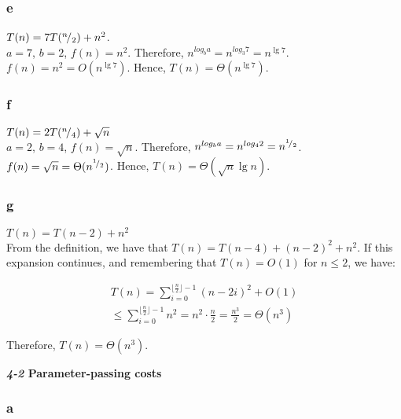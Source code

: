 \documentclass[8pt,a4paper]{article}
\begin{document}
\subsubsection*{e}

$T(n) = 7T({}^{n}\!/_{2}) + n^{2}$. \\
$a = 7$, $b = 2$, $f(n) = n^{2}$. Therefore, $n^{log_{b} a} = n^{log_{3} 7} = n^{\lg 7}$.
$f(n) = n^{2} = O(n^{\lg 7})$. Hence, $T(n) = \Theta(n^{\lg 7})$.

\subsubsection*{f}

$T(n) = 2T({}^{n}\!/_{4}) + \sqrt{n}$ \\
$a = 2$, $b = 4$, $f(n) = \sqrt{n}$. Therefore, $n^{log_{b} a} = n^{log_{4} 2} = n^{{}^{1}\!/_{2}}$.
$f(n) = \sqrt{n} = \Theta(n^{{}^{1}\!/_{2}})$. Hence, $T(n) = \Theta(\sqrt{n} \lg n)$.

\newpage

\subsubsection*{g}

$T(n) = T(n - 2) + n^{2}$ \\

  From the definition, we have that $T(n) = T(n - 4) + (n - 2)^{2} + n^{2}$. If this
expansion continues, and remembering that $T(n) = O(1)$ for $n \leq 2$, we have:

\begin{equation*}
  \begin{split}
    T(n) = \sum\limits_{i = 0}^{\lfloor \frac{n}{2} \rfloor - 1} (n - 2i)^{2} + O(1) \\
    \leq \sum\limits_{i = 0}^{\lfloor \frac{n}{2} \rfloor - 1} n^{2}
    = n^{2} \cdot \frac{n}{2} = \frac{n^{3}}{2} = \Theta(n^{3})
  \end{split}
\end{equation*}

  Therefore, $T(n) = \Theta(n^{3})$. \\

\begin{framed}
\textbf{\textit{4-2} Parameter-passing costs}
\end{framed}

\subsubsection*{a}
\end{document}
